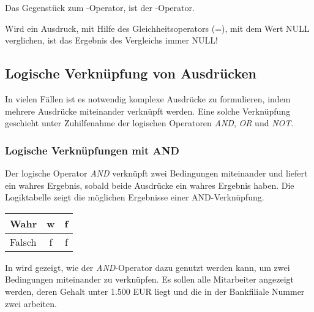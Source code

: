           Das Gegenstück zum -Operator, ist der -Operator.
\clearpage
          \begin{merke}
            Wird ein Ausdruck, mit Hilfe des Gleichheitsoperators (=), mit dem Wert NULL verglichen, ist das Ergebnis des Vergleichs immer NULL!
          \end{merke}
      \subsection{Logische Verknüpfung von Ausdrücken}
        In vielen Fällen ist es notwendig komplexe Ausdrücke zu formulieren, indem mehrere Ausdrücke miteinander verknüpft werden. Eine solche Verknüpfung geschieht unter Zuhilfenahme der logischen Operatoren \textit{AND}, \textit{OR} und \textit{NOT}.
        \subsubsection{Logische Verknüpfungen mit AND}
          Der logische Operator \textit{AND} verknüpft zwei Bedingungen miteinander und liefert ein wahres Ergebnis, sobald beide Ausdrücke ein wahres Ergebnis haben. Die Logiktabelle  zeigt die möglichen Ergebnisse einer AND-Verknüpfung.
					\vspace{\baselineskip}
          \begin{center}
            \label{logikand}
            \tablehead{}
            \tabletail{
              \hline
            }
            \tablelasttail{
              \hline
            }
            \begin{supertabular}{|l|c|c|}
              Wahr & w & f \\
              \hline
              Falsch & f & f \\
            \end{supertabular}
          \end{center}
          In  wird gezeigt, wie der \textit{AND}-Operator dazu genutzt werden kann, um zwei Bedingungen miteinander zu verknüpfen. Es sollen alle Mitarbeiter angezeigt werden, deren Gehalt unter 1.500 EUR liegt und die in der Bankfiliale Nummer zwei arbeiten.
